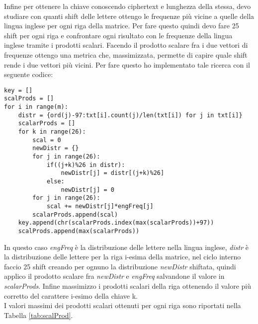 \documentclass{article}
\begin{document}
Infine per ottenere la chiave conoscendo ciphertext e lunghezza della stessa, devo studiare con quanti shift delle lettere ottengo le frequenze più vicine a quelle della lingua inglese per ogni riga della matrice. Per fare questo quindi devo fare 25 shift per ogni riga e confrontare ogni risultato con le frequenze della lingua inglese tramite i prodotti scalari. Facendo il prodotto scalare fra i due vettori di frequenze ottengo una metrica che, massimizzata, permette di capire quale shift rende i due vettori più vicini. Per fare questo ho implementato tale ricerca con il seguente codice:
\begin{lstlisting}
key = []
scalProds = []
for i in range(m):
    distr = {ord(j)-97:txt[i].count(j)/len(txt[i]) for j in txt[i]}
    scalarProds = []
    for k in range(26):
        scal = 0
        newDistr = {}
        for j in range(26):
            if((j+k)%26 in distr):
                newDistr[j] = distr[(j+k)%26]
            else: 
                newDistr[j] = 0
        for j in range(26):
            scal += newDistr[j]*engFreq[j]
        scalarProds.append(scal)
    key.append(chr(scalarProds.index(max(scalarProds))+97))
    scalProds.append(max(scalarProds))
\end{lstlisting}
In questo caso \textit{engFreq} è la distribuzione delle lettere nella lingua inglese, \textit{distr} è la distribuzione delle lettere per la riga i-esima della matrice, nel ciclo interno faccio 25 shift creando per ognuno la distribuzione \textit{newDistr} shiftata, quindi applico il prodotto scalare fra \textit{newDistr} e \textit{engFreq} salvandone il valore in \textit{scalarProds}. Infine massimizzo i prodotti scalari della riga ottenendo il valore più corretto del carattere i-esimo della chiave k.\\
I valori massimi dei prodotti scalari ottenuti per ogni riga sono riportati nella Tabella \ref{tab:scalProd}.
\end{document}
